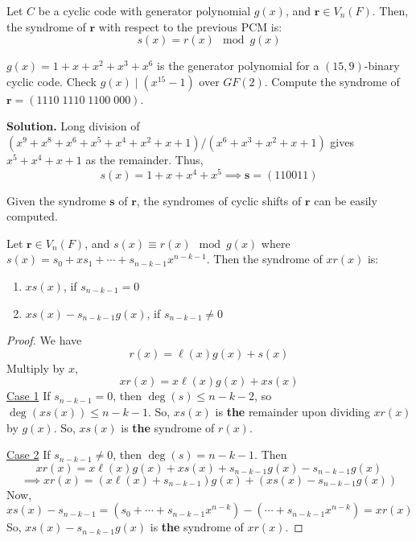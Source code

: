 \begin{thmbox}
    \begin{theorem}
        Let $ C $ be a cyclic code with generator polynomial $ g(x) $, and $ \bm{r}\in V_n(F) $.
        Then, the syndrome of $ \bm{r} $ with respect to the previous PCM is:
        \[ s(x)=r(x)\mod g(x) \]
    \end{theorem}
\end{thmbox}

\begin{exbox}
    \begin{example}
        $ g(x)=1+x+x^2+x^3+x^6 $ is the generator polynomial for a $ (15,9) $-binary cyclic code.
        Check $ g(x)\mid (x^{15}-1) $ over $ GF(2) $. Compute the syndrome of
        $ \bm{r}=(1110\; 1110\; 1100\; 000) $.

        \textbf{Solution.} Long division of $ (x^9+x^8+x^6+x^5+x^4+x^2+x+1)/(x^6+x^3+x^2+x+1) $
        gives $ x^5+x^4+x+1 $ as the remainder. Thus,
        \[ s(x)=1+x+x^4+x^5\implies \bm{s}=(110011) \]
    \end{example}
\end{exbox}

\begin{remark}
    Given the syndrome $ \bm{s} $ of $ \bm{r} $, the syndromes of cyclic shifts of $ \bm{r} $
    can be easily computed.
\end{remark}

\begin{thmbox}
    \begin{theorem}\label{syndrome calculation}
        Let $ \bm{r}\in V_n(F) $, and $ s(x) \equiv r(x)\mod g(x) $ where
        $ s(x) = s_0+xs_1+\cdots+s_{n-k-1}x^{n-k-1} $.
        Then the syndrome of $ xr(x) $ is:
        \begin{enumerate}[label=(\roman*)]
            \item $ xs(x) $, if $ s_{n-k-1}=0 $
            \item $ xs(x)-s_{n-k-1}g(x) $, if $ s_{n-k-1}\neq 0 $
        \end{enumerate}
    \end{theorem}
\end{thmbox}

\begin{proof}
    We have
    \[ r(x)=\ell (x)g(x)+s(x) \]
    Multiply by $ x $,
    \[ xr(x)=x\ell(x)g(x)+xs(x) \]
    \underline{Case 1} If $ s_{n-k-1}=0 $, then $ \deg(s)\leqslant n-k-2 $,
    so $ \deg(xs(x))\leqslant n-k-1 $. So, $ xs(x) $ is \textbf{the} remainder upon dividing
    $ xr(x) $ by $ g(x) $. So, $ xs(x) $ is \textbf{the} syndrome of $ r(x) $.

    \underline{Case 2} If $ s_{n-k-1}\neq 0 $, then $ \deg(s)=n-k-1 $. Then
    \[ xr(x)=x\ell(x)g(x)+xs(x)+s_{n-k-1}g(x)-s_{n-k-1}g(x) \]
    \[ \implies xr(x)=(x\ell(x)+s_{n-k-1})g(x)+(xs(x)-s_{n-k-1}g(x)) \]
    Now,
    \[ xs(x)-s_{n-k-1}=(s_0+\cdots+s_{n-k-1}x^{n-k})-(\cdots+s_{n-k-1}x^{n-k})=xr(x) \]
    So, $ xs(x)-s_{n-k-1}g(x) $ is \textbf{the} syndrome of $ xr(x) $.
\end{proof}
